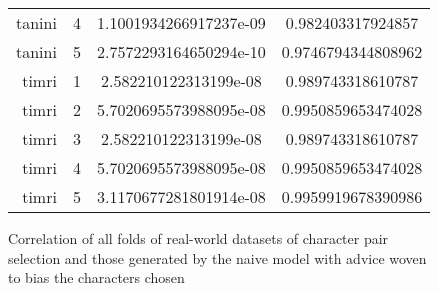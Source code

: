 \begin{figure}[h]
\begin{longtable}{r|c|c|c}
      tanini & 4 & 1.1001934266917237e-09 & 0.982403317924857  \\
      tanini & 5 & 2.7572293164650294e-10 & 0.9746794344808962  \\
      timri & 1 & 2.582210122313199e-08 & 0.989743318610787  \\
      timri & 2 & 5.7020695573988095e-08 & 0.9950859653474028  \\
      timri & 3 & 2.582210122313199e-08 & 0.989743318610787  \\
      timri & 4 & 5.7020695573988095e-08 & 0.9950859653474028  \\
      timri & 5 & 3.1170677281801914e-08 & 0.9959919678390986 \\
    \end{longtable}
    \caption{Correlation of all folds of real-world datasets of character pair selection and those generated by the naive model with advice woven to bias the characters chosen\\}
    \label{prior_distribution_results_table_comparison_to_real_world_datasets}

\end{figure}


